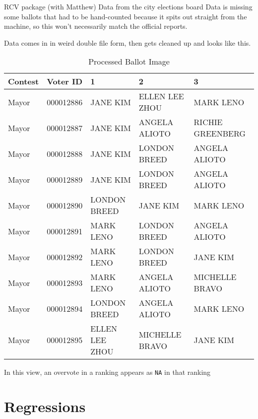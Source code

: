 \documentclass[12pt,twoside]{reedthesis}
\theoremstyle{definition}
\theoremstyle{definition}
\theoremstyle{definition}
\theoremstyle{remark}
\begin{document}
RCV package (with Matthew) Data from the city elections board Data is
missing some ballots that had to be hand-counted because it spits out
straight from the machine, so this won't necessarily match the official
reports.

Data comes in in weird double file form, then gets cleaned up and looks
like this.
\begin{longtable}[t]{lllll}
\caption{\label{tab:unnamed-chunk-11}Processed Ballot Image}\\
\toprule
Contest & Voter ID & 1 & 2 & 3\\
\midrule
Mayor & 000012886 & JANE KIM & ELLEN LEE ZHOU & MARK LENO\\
Mayor & 000012887 & JANE KIM & ANGELA ALIOTO & RICHIE GREENBERG\\
Mayor & 000012888 & JANE KIM & LONDON BREED & ANGELA ALIOTO\\
Mayor & 000012889 & JANE KIM & LONDON BREED & ANGELA ALIOTO\\
Mayor & 000012890 & LONDON BREED & JANE KIM & MARK LENO\\
\addlinespace
Mayor & 000012891 & MARK LENO & LONDON BREED & ANGELA ALIOTO\\
Mayor & 000012892 & MARK LENO & LONDON BREED & JANE KIM\\
Mayor & 000012893 & MARK LENO & ANGELA ALIOTO & MICHELLE BRAVO\\
Mayor & 000012894 & LONDON BREED & ANGELA ALIOTO & MARK LENO\\
Mayor & 000012895 & ELLEN LEE ZHOU & MICHELLE BRAVO & JANE KIM\\
\bottomrule
\end{longtable}
In this view, an overvote in a ranking appears as \texttt{NA} in that
ranking

\hypertarget{regressions}{%
\section{Regressions}\label{regressions}}
\end{document}
